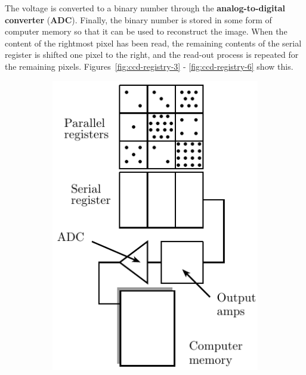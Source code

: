 The voltage is
converted to a binary number through the \textbf{analog-to-digital converter}
(\textbf{ADC}). Finally, the binary number is stored in some form of computer
memory so that it can be used to reconstruct the image. When the
content of the rightmost pixel has been read, the remaining contents of the
serial register is shifted one pixel to the right, and the read-out process is
repeated for the remaining pixels. Figures~\ref{fig:ccd-registry-3} -
\ref{fig:ccd-registry-6} show this.
\begin{figure}[htpb]
	\centering
	\begin{subfigure}[t]{0.5\textwidth}
		\centering
		\includegraphics[scale=1.0]{ccd-registry-1.pdf}
		\caption{}
	\end{subfigure}%
	\begin{subfigure}[t]{0.5\textwidth}
		\centering

\end{subfigure}
\end{figure}
